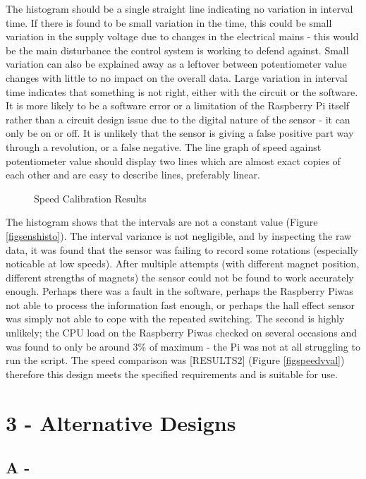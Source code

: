 \documentclass[twoside,a4]{report}
\def\br{\newline \newline \noindent}
\def\rpi{Raspberry Pi}
\begin{document}
The histogram should be a single straight line indicating no variation in interval time. If there is found to be small variation in the time, this could be small variation in the supply voltage due to changes in the electrical mains - this would be the main disturbance the control system is working to defend against. Small variation can also be explained away as a leftover between potentiometer value changes with little to no impact on the overall data. Large variation in interval time indicates that something is not right, either with the circuit or the software. It is more likely to be a software error or a limitation of the Raspberry Pi itself rather than a circuit design issue due to the digital nature of the sensor - it can only be on or off. It is unlikely that the sensor is giving a false positive part way through a revolution, or a false negative. \newline \newline \noindent
The line graph of speed against potentiometer value should display two lines which are almost exact copies of each other and are easy to describe lines, preferably linear.\br
	\begin{figure}[!htb]
		\centering
		\label{fig2speeds}
		\caption{Speed Calibration Results}
	\end{figure} \newline  \noindent
	The histogram shows that the intervals are not a constant value (Figure \ref{figsenshisto}). The interval variance is not negligible, and by inspecting the raw data, it was found that the sensor was failing to record some rotations (especially noticable at low speeds). After multiple attempts (with different magnet position, different strengths of magnets) the sensor could not be found to work accurately enough. Perhaps there was a fault in the software, perhaps the \rpi was not able to process the information fast enough, or perhaps the hall effect sensor was simply not able to cope with the repeated switching. The second is highly unlikely; the CPU load on the \rpi was checked on several occasions and was found to only be around 3\% of maximum - the Pi was not at all struggling to run the script.\br
	The speed comparison was [RESULTS2] (Figure \ref{figspeedvval}) therefore this design meets the specified requirements and is suitable for use.
\section{3 - Alternative Designs}
\subsection{A - }
\end{document}
